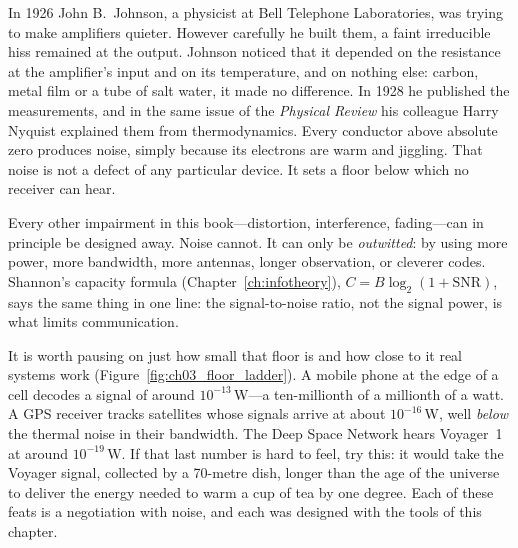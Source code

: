 In 1926 John B.~Johnson, a physicist at Bell Telephone Laboratories, was trying to make
amplifiers quieter. However carefully he built them, a faint irreducible hiss remained at the
output. Johnson noticed that it depended on the resistance at the amplifier's input and on its
temperature, and on nothing else: carbon, metal film or a tube of salt water, it made no
difference. In 1928 he published the measurements, and in the same issue of the \emph{Physical
Review} his colleague Harry Nyquist explained them from thermodynamics. Every conductor above
absolute zero produces noise, simply because its electrons are warm and jiggling. That noise is
not a defect of any particular device. It sets a floor below which no receiver can hear.

Every other impairment in this book---distortion, interference, fading---can in principle be
designed away. Noise cannot. It can only be \emph{outwitted}: by using more power, more
bandwidth, more antennas, longer observation, or cleverer codes. Shannon's capacity formula
(Chapter~\ref{ch:infotheory}), $C=B\log_2(1+\mathrm{SNR})$, says the same thing in one line: the
signal-to-noise ratio, not the signal power, is what limits communication.


It is worth pausing on just how small that floor is and how close to it real systems work
(Figure~\ref{fig:ch03_floor_ladder}). A mobile phone at the edge of a cell decodes a signal of
around $10^{-13}$\,W---a ten-millionth of a millionth of a watt. A GPS receiver tracks satellites
whose signals arrive at about $10^{-16}$\,W, well \emph{below} the thermal noise in their
bandwidth. The Deep Space Network hears Voyager~1 at around $10^{-19}$\,W. If that last number is
hard to feel, try this: it would take the Voyager signal, collected by a 70-metre dish, longer
than the age of the universe to deliver the energy needed to warm a cup of tea by one degree.
Each of these feats is a negotiation with noise, and each was designed with the tools of this
chapter.

